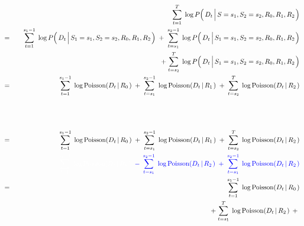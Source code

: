 \begin{eqnarray*}
&&
	\overset{T}{\underset{t=1}{\sum}}\;
	\log P\!\left(\,D_{t} \left\vert\,S\overset{{\color{white}1}}{=}s_{1},S_{2}=s_{2},R_{0},R_{1},R_{2}\right.\right)
\\
&=&
	{\color{white}+} \;
	\overset{s_{1}-1}{\underset{t=1}{\sum}}\;
	\log P\!\left(\,D_{t} \left\vert\,S_{1}\overset{{\color{white}1}}{=}s_{1},S_{2}=s_{2},R_{0},R_{1},R_{2}\right.\right)
	\; + \;
	\overset{s_{2}-1}{\underset{t=s_{1}}{\sum}}\;
	\log P\!\left(\,D_{t} \left\vert\,S_{1}\overset{{\color{white}1}}{=}s_{1},S_{2}=s_{2},R_{0},R_{1},R_{2}\right.\right)
\\
&&
	+ \;
	\overset{T}{\underset{t=s_{2}}{\sum}}\;
	\log P\!\left(\,D_{t} \left\vert\,S_{1}\overset{{\color{white}1}}{=}s_{1},S_{2}=s_{2},R_{0},R_{1},R_{2}\right.\right)
\\
&=&
	\overset{s_{1}-1}{\underset{t=1}{\sum}}\;
	\log \textnormal{Poisson}\!\left(D_{t} \left\vert\,R_{0}\right.\right)
	\; + \;
	\overset{s_{2}-1}{\underset{t=s_{1}}{\sum}}\;
	\log \textnormal{Poisson}\!\left(D_{t} \left\vert\,R_{1}\right.\right)
	\; + \;
	\overset{T}{\underset{t=s_{2}}{\sum}}\;
	\log \textnormal{Poisson}\!\left(D_{t} \left\vert\,R_{2}\right.\right)
\\
\\
\\
\\
&=&
	\overset{s_{1}-1}{\underset{t=1}{\sum}}\;
	\log \textnormal{Poisson}\!\left(D_{t} \left\vert\,R_{0}\right.\right)
	\; + \;
	\overset{s_{2}-1}{\underset{t=s_{1}}{\sum}}\;
	\log \textnormal{Poisson}\!\left(D_{t} \left\vert\,R_{1}\right.\right)
	\; + \;
	\overset{T}{\underset{t=s_{2}}{\sum}}\;
	\log \textnormal{Poisson}\!\left(D_{t} \left\vert\,R_{2}\right.\right)
\\
&&
	{\color{white}
		\overset{s_{1}-1}{\underset{t=1}{\sum}}\;
		\log \textnormal{Poisson}\!\left(D_{t} \left\vert\,R_{0}\right.\right)
		}
	{\color{blue}
		\;\; - \;\,
		\overset{s_{2}-1}{\underset{t=s_{1}}{\sum}}\;
		\log \textnormal{Poisson}\!\left(D_{t} \left\vert\,R_{2}\right.\right)
		\; + \;
		\overset{s_{2}-1}{\underset{t=s_{1}}{\sum}}\;
		\log \textnormal{Poisson}\!\left(D_{t} \left\vert\,R_{2}\right.\right)
		}
\\
&=&
	{\color{white}+} \,
	\overset{s_{1}-1}{\underset{t=1}{\sum}}\;
	\log \textnormal{Poisson}\!\left(D_{t} \left\vert\,R_{0}\right.\right)
\\
&&
	+ \;
	\overset{T}{\underset{t=s_{1}}{\sum}}\;
	\log \textnormal{Poisson}\!\left(D_{t} \left\vert\,R_{2}\right.\right)
	\; + \;

\end{eqnarray*}
